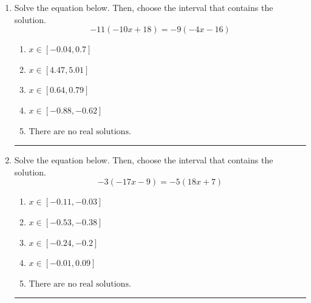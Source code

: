 \documentclass[14pt]{extbook}
\newcommand{\litem}[1]{\item#1\hspace*{-1cm}\rule{\textwidth}{0.4pt}}
\begin{document}
\begin{enumerate}
{\begin{enumerate}[label=\Alph*.]
\end{enumerate} }
\litem{
Solve the equation below. Then, choose the interval that contains the solution.\[ -11(-10x + 18) = -9(-4x -16) \]\begin{enumerate}[label=\Alph*.]
\item \( x \in [-0.04, 0.7] \)
\item \( x \in [4.47, 5.01] \)
\item \( x \in [0.64, 0.79] \)
\item \( x \in [-0.88, -0.62] \)
\item \( \text{There are no real solutions.} \)

\end{enumerate} }
\litem{
Solve the equation below. Then, choose the interval that contains the solution.\[ -3(-17x -9) = -5(18x + 7) \]\begin{enumerate}[label=\Alph*.]
\item \( x \in [-0.11, -0.03] \)
\item \( x \in [-0.53, -0.38] \)
\item \( x \in [-0.24, -0.2] \)
\item \( x \in [-0.01, 0.09] \)
\item \( \text{There are no real solutions.} \)


\end{enumerate}}
\end{enumerate}
\end{document}
